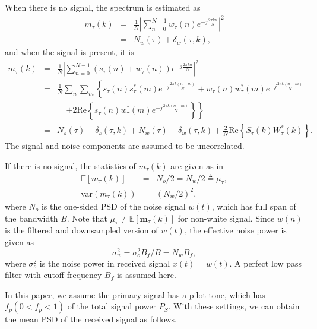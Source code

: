 \documentclass[draftclsnofoot,onecolumn,12pt]{IEEEtran}
\begin{document}
When there is no signal, the spectrum is estimated as
\begin{eqnarray}
    m_\tau(k) &=& \frac{1}{N}\left|\sum_{n=0}^{N-1} w_\tau(n)e^{-j\frac{2\pi kn}{N}}\right|^2 \\
              &=& N_w(\tau) + \delta_w(\tau, k),
\end{eqnarray}
and when the signal is present, it is
\begin{eqnarray}
    m_\tau(k) &=& \frac{1}{N}\left|\sum_{n=0}^{N-1} (s_\tau(n) + w_\tau(n) )e^{-j\frac{2\pi kn}{N}}\right|^2 \nonumber \\
              &=& \frac{1}{N}\sum_n \sum_m \left\{s_\tau(n)s_\tau^\ast(m) e^{-j\frac{2\pi k(n-m)}{N}} +
                      w_\tau(n)w_\tau^\ast(m) e^{-j\frac{2\pi k(n-m)}{N}} \right. \nonumber \\
              & &  \;\;\;\; \left. + 2 \mathrm{Re}\left\{s_\tau(n)w_\tau^\ast(m) e^{-j\frac{2\pi k(n-m)}{N}} \right\} \right\} \nonumber \\
	      &=&  N_s(\tau) + \delta_s(\tau, k) + N_w(\tau) + \delta_w(\tau, k) + \frac{2}{N}\mathrm{Re}\left\{S_\tau(k) W_\tau^\ast(k)\right\}. \label{eq:m_tau_signal}
\end{eqnarray}
The signal and noise components are assumed to be uncorrelated.

If there is no signal, the statistics of $m_\tau(k)$ are given as in \cite{ProakisBook96}
\begin{eqnarray}
  \mathbb{E} \left[m_\tau(k)\right] &=& N_o/2 = N_w/2 \triangleq \mu_\tau, \\
    \mathrm{var}\left(m_\tau(k)\right) &=& \left(N_w/2\right)^2, \end{eqnarray}
where $N_o$ is the one-sided PSD of the noise signal $w(t)$, which has full span of the bandwidth $B$. Note that $\mu_\tau \neq \mathbb{E}[\mathbf{m}_\tau(k)]$ for non-white signal. Since $w(n)$ is the filtered and downsampled version of $w(t)$, the effective noise power is given as
\begin{equation}
    \sigma_w^2 = \sigma_o^2 B_f/B = N_w B_f,
\end{equation}
where $\sigma_o^2$ is the noise power in received signal $x(t) = w(t)$. A perfect low pass filter with cutoff frequency $B_f$ is assumed here.

In this paper, we assume
the primary signal has a pilot tone, which has $f_p (0 < f_p < 1)$ of the total signal power $P_S$.
With these settings, we can obtain the mean PSD of the received signal as follows.
\end{document}

